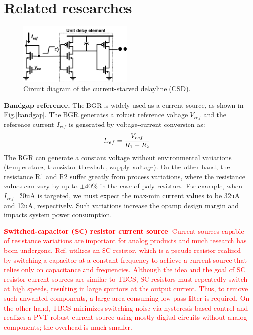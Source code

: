 \documentclass[paper]{ieice}
\begin{document}
\section{Related researches}


\begin{figure}[!t]
\centering
 \includegraphics[width=0.5\textwidth]{figs/inv.png}
  \caption{Circuit diagram of the current-starved delayline (CSD).}
\label{inv}
\end{figure}

\qquad \textbf{Bandgap reference:} The BGR is widely used as a current source, as shown in Fig.\ref{bandgap}. The BGR generates a robust reference voltage $V_{ref}$ and the reference current $I_{ref}$ is generated by voltage-current conversion as:
\begin{eqnarray}
    \centering
    I_{ref} = \frac{V_{ref}}{R_1 + R_2}
    \label{sar13b}
\end{eqnarray}
The BGR can generate a constant voltage without environmental variations (temperature, transistor threshold, supply voltage). On the other hand, the resistance R1 and R2 suffer greatly from process variations, where the resistance values can vary by up to $\pm 40\%$ in the case of poly-resistors. For example, when $I_{ref}$=20uA is targeted, we must expect the max-min current values to be 32uA and 12uA, respectively. Such variations increase the opamp design margin and impacts system power consumption.

\textcolor{red}{\textbf{Switched-capacitor (SC) resistor current source:} Current sources capable of resistance variations are important for analog products and much research has been undergone. Ref.\cite{chuanyang,ron} utilizes an SC resistor, which is a pseudo-resistor realized by switching a capacitor at a constant frequency to achieve a current source that relies only on capacitance and frequencies. Although the idea and the goal of SC resistor current sources are similar to TBCS, SC resistors must repeatedly switch at high speeds, resulting in large spurious at the output current. Thus, to remove such unwanted components, a large area-consuming low-pass filter is required. On the other hand, TBCS minimizes switching noise via hysteresis-based control and realizes a PVT-robust current source using mostly-digital circuits without analog components; the overhead is much smaller.}
\end{document}
